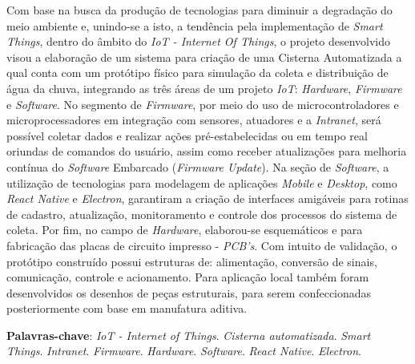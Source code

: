 
\begin{resumo}[RESUMO]
\begin{SingleSpacing}

 Com base na busca da produção de tecnologias para diminuir a degradação do meio ambiente e, unindo-se a isto, a tendência pela implementação de \textit{Smart Things}, dentro do âmbito do \textit{IoT - Internet Of Things},  o projeto desenvolvido visou a elaboração de um sistema para criação de uma Cisterna Automatizada a qual conta com um protótipo físico para simulação da coleta e distribuição de água da chuva, integrando as três áreas de um projeto \textit{IoT}: \textit{Hardware}, \textit{Firmware} e \textit{Software}. No segmento de \textit{Firmware}, por meio do uso de microcontroladores e microprocessadores em integração com sensores, atuadores e a \textit{Intranet}, será possível coletar dados e realizar ações pré-estabelecidas ou em tempo real oriundas de comandos do usuário, assim como receber atualizações para melhoria contínua do \textit{Software} Embarcado (\textit{Firmware Update}).  Na seção de \textit{Software}, a utilização de tecnologias para modelagem de aplicações \textit{Mobile} e \textit{Desktop}, como  \textit{React Native} e \textit{Electron},  garantiram a criação de interfaces amigáveis para rotinas de cadastro, atualização, monitoramento e controle dos processos do sistema de coleta. Por fim, no campo de \textit{Hardware}, elaborou-se esquemáticos e para fabricação das placas de circuito impresso - \textit{PCB's}. Com intuito de validação, o protótipo construído possui estruturas de: alimentação, conversão de sinais, comunicação, controle e acionamento. Para aplicação local também foram desenvolvidos os desenhos de peças estruturais, para serem confeccionadas posteriormente com base em manufatura aditiva.
 
 
\vspace{\onelineskip}

\textbf{Palavras-chave}: \textit{IoT - Internet of Things}. \textit{Cisterna automatizada}. \textit{Smart Things}. \textit{Intranet}.   \textit{Firmware}. \textit{Hardware}. \textit{Software}. \textit{React Native}. \textit{Electron}.

\end{SingleSpacing}
\end{resumo}


